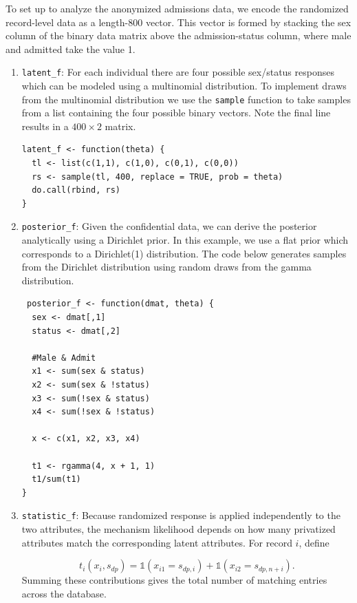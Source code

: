 To set up  to analyze the anonymized admissions data, we encode
the randomized record-level data as a length-800 vector. This vector is formed
by stacking the sex column of the binary data matrix above the admission-status
column, where male and admitted take the value 1.

\begin{enumerate}
\def\labelenumi{\arabic{enumi}.}
\item
  \texttt{latent\_f}: For each individual there are four possible
  sex/status responses which can be modeled using a multinomial distribution.
  To implement draws from the multinomial distribution we use the \texttt{sample} function
  to take samples from a list containing the four possible binary vectors. Note
  the final line results in a \(400 \times 2\) matrix.

\begin{verbatim}
latent_f <- function(theta) {
  tl <- list(c(1,1), c(1,0), c(0,1), c(0,0))
  rs <- sample(tl, 400, replace = TRUE, prob = theta)
  do.call(rbind, rs)
}
\end{verbatim}
\item
  \texttt{posterior\_f}: Given the confidential data, we can derive the posterior analytically
  using a Dirichlet prior. In this example, we use a flat prior which
  corresponds to a Dirichlet(1) distribution. The code below generates samples from the Dirichlet distribution
  using random draws from the gamma distribution.

\begin{verbatim}
 posterior_f <- function(dmat, theta) {
  sex <- dmat[,1]
  status <- dmat[,2]

  #Male & Admit
  x1 <- sum(sex & status)
  x2 <- sum(sex & !status)
  x3 <- sum(!sex & status)
  x4 <- sum(!sex & !status)

  x <- c(x1, x2, x3, x4)

  t1 <- rgamma(4, x + 1, 1)
  t1/sum(t1)
}
\end{verbatim}
\item
  \texttt{statistic\_f}: Because randomized response is applied independently to the
  two attributes, the mechanism likelihood depends on how many privatized
  attributes match the corresponding latent attributes. For record \(i\), define

  \begin{equation*}
   t_i(x_i, s_{dp}) =
   \mathbb{1}(x_{i1} = s_{dp,i}) +
   \mathbb{1}(x_{i2} = s_{dp,n+i}).
   \end{equation*}
  Summing these contributions gives the total number of matching entries across
  the database.


\end{enumerate}
